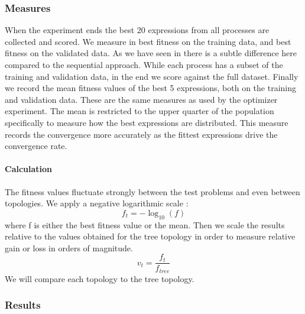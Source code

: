 \subsubsection{Measures}
When the experiment ends the best 20 expressions from all processes are collected and scored. We measure in best fitness on the training data, and best fitness on the validated data. As we have seen in %
there is a subtle difference here compared to the sequential approach. While each process has a subset of the training and validation data, in the end we score against the full dataset.
Finally we record the mean fitness values of the best 5 expressions, both on the training and validation data. These are the same measures as used by the optimizer experiment. The mean is restricted to the upper quarter of the population specifically to measure how the best expressions are distributed. This measure records the convergence more accurately as the fittest expressions drive the convergence rate. 
\paragraph{Calculation}
The fitness values fluctuate strongly between the test problems and even between topologies. We apply a negative logarithmic scale :
\[
f_t = -\log_{10}(f)
\]
where f is either the best fitness value or the mean. Then we scale the results relative to the values obtained for the tree topology in order to measure relative gain or loss in orders of magnitude.
\[
v_{t} = \frac{f_{t}}{f_{tree}}
\]
We will compare each topology to the tree topology.
\subsubsection{Results}
